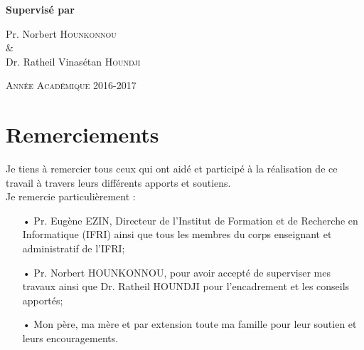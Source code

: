 \documentclass[12pt,a4paper]{article}
\begin{document}
\begin{titlepage}
		\vspace{1cm}{\scshape\Large Institut de Formation et de Recherche en Informatique (IFRI)\par}
		\vspace{1cm}{\scshape\Large Mémoire pour l'obtention du diplôme de Master en Systèmes d'Information et Réseaux Informatiques\par}
		\vspace{1.5cm}{\huge\bfseries Résolution de "Pigment Sequencing Problem" avec les algorithmes génétiques\par}
		\vfill
		\Large\textbf{Supervisé par}\par Pr. Norbert \textsc{Hounkonnou} \\ \& \\ Dr. Ratheil Vinasétan \textsc{Houndji}
		\vfill
		{\large \scshape Année Académique 2016-2017 \par}
	\end{titlepage}

	\newpage %
	
	\section*{Remerciements}
	
	\vspace{2.5cm}
	
	Je tiens à remercier tous ceux qui ont aidé et participé à la réalisation de ce travail à travers leurs différents apports et soutiens. \\
	\hspace*{.5cm}Je remercie particulièrement : \\
	\begin{itemize}
		\item[•] Pr. Eugène EZIN, Directeur de l'Institut de Formation et de Recherche en Informatique (IFRI) ainsi que tous les membres du corps enseignant et administratif de l'IFRI;
		\item[•] Pr. Norbert HOUNKONNOU, pour avoir accepté de superviser mes travaux ainsi que Dr. Ratheil HOUNDJI pour l'encadrement et les conseils apportés;
		\item[•] Mon père, ma mère et par extension toute ma famille pour leur soutien et leurs encouragements. 
	\end{itemize}
	
\end{document}
